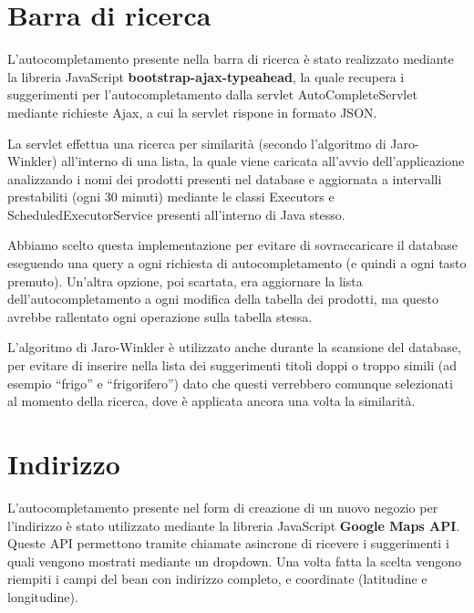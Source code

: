\section{Barra di ricerca}
L'autocompletamento presente nella barra di ricerca è stato realizzato mediante la libreria JavaScript  \textbf{bootstrap-ajax-typeahead}, la quale recupera i suggerimenti per l'autocompletamento dalla servlet AutoCompleteServlet mediante richieste Ajax, a cui la servlet rispone in formato JSON.

La servlet effettua una ricerca per similarità (secondo l'algoritmo di Jaro-Winkler) all'interno di una lista, la quale viene caricata all'avvio dell'applicazione analizzando i nomi dei prodotti presenti nel database e aggiornata a intervalli prestabiliti (ogni 30 minuti) mediante le classi Executors e ScheduledExecutorService presenti all'interno di Java stesso.

Abbiamo scelto questa implementazione per evitare di sovraccaricare il database eseguendo una query a ogni richiesta di autocompletamento (e quindi a ogni tasto premuto).
Un'altra opzione, poi scartata, era aggiornare la lista dell'autocompletamento a ogni modifica della tabella dei prodotti, ma questo avrebbe rallentato ogni operazione sulla tabella stessa.

L'algoritmo di Jaro-Winkler è utilizzato anche durante la scansione del database, per evitare di inserire nella lista dei suggerimenti titoli doppi o troppo simili (ad esempio ``frigo'' e ``frigorifero'') dato che questi verrebbero comunque selezionati al momento della ricerca, dove è applicata ancora una volta la similarità.

\section{Indirizzo}
L'autocompletamento presente nel form di creazione di un nuovo negozio per l'indirizzo è stato utilizzato mediante la libreria JavaScript \textbf{Google Maps API}. Queste API permettono tramite chiamate asincrone di ricevere i suggerimenti i quali vengono mostrati mediante un dropdown. Una volta fatta la scelta vengono riempiti i campi del bean con indirizzo completo, e coordinate (latitudine e longitudine).

